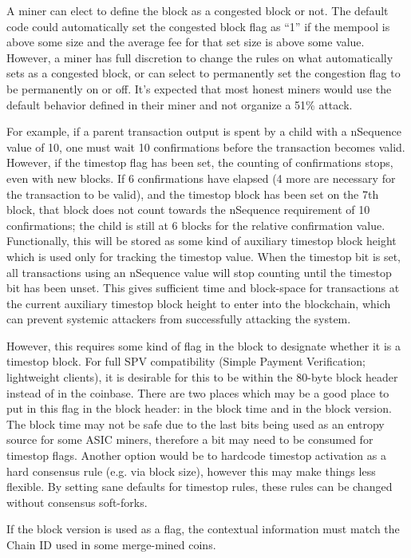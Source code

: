 \documentclass[letterpaper,11pt]{article}
\begin{document}
A miner can elect to define the block as a congested block or not. The default
code could automatically set the congested block flag as ``1'' if the mempool is
above some size and the average fee for that set size is above some value.
However, a miner has full discretion to change the rules on what automatically
sets as a congested block, or can select to permanently set the congestion flag
to be permanently on or off. It's expected that most honest miners would use the
default behavior defined in their miner and not organize a 51\% attack.

For example, if a parent transaction output is spent by a child with a nSequence
value of 10, one must wait 10 confirmations before the transaction becomes
valid. However, if the timestop flag has been set, the counting of confirmations
stops, even with new blocks. If 6 confirmations have elapsed (4 more are
necessary for the transaction to be valid), and the timestop block has been set
on the 7th block, that block does not count towards the nSequence requirement of
10 confirmations; the child is still at 6 blocks for the relative confirmation
value. Functionally, this will be stored as some kind of auxiliary timestop
block height which is used only for tracking the timestop value. When the
timestop bit is set, all transactions using an nSequence value will stop
counting until the timestop bit has been unset. This gives sufficient time and
block-space for transactions at the current auxiliary timestop block height to
enter into the blockchain, which can prevent systemic attackers from
successfully attacking the system.

However, this requires some kind of flag in the block to designate whether it
is a timestop block. For full SPV compatibility (Simple Payment Verification;
lightweight clients), it is desirable for this to be within the 80-byte block
header instead of in the coinbase. There are two places which may be a good
place to put in this flag in the block header: in the block time and in the
block version. The block time may not be safe due to the last bits being used as
an entropy source for some ASIC miners, therefore a bit may need to be consumed
for timestop flags. Another option would be to hardcode timestop activation as a
hard consensus rule (e.g. via block size), however this may make things less
flexible. By setting sane defaults for timestop rules, these rules can be
changed without consensus soft-forks.

If the block version is used as a flag, the contextual information must match
the Chain ID used in some merge-mined coins.
\end{document}
